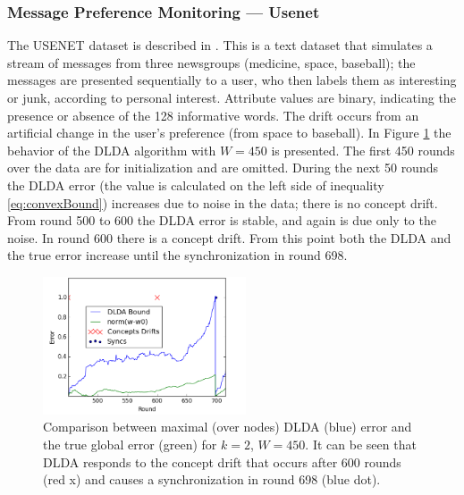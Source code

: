 \documentclass{sig-alternate-05-2015}
\begin{document}
\subsubsection{Message Preference Monitoring --- Usenet}
The USENET dataset is described in \cite{usenet}.
This is a text dataset that simulates a stream of messages from three newsgroups
(medicine, space, baseball); the messages are presented sequentially to a user, 
who then labels them as interesting or junk, according to personal interest. 
Attribute values are binary, indicating the presence or absence of the 128
informative words. The drift occurs from an artificial change in the user's
preference (from space to baseball). In Figure \ref{usenet} the behavior of the
DLDA algorithm with $W=450$ is presented. The first 450 rounds over the data are for
initialization and are omitted. During the next 50 rounds the DLDA error 
(the value is calculated on the left side of inequality
\ref{eq:convexBound}) increases due to noise in the data; there is
no concept drift. From round 500 to 600 the DLDA error is stable, 
and again is due only to the noise. In round 600 there is a concept 
drift.
From this point both the DLDA and the true error increase until the 
synchronization in round 698.

\begin{figure}[h]
	\centering
	\includegraphics[width=60mm]{Usenet/DriftDetected.png}
	\caption{Comparison between maximal (over nodes) DLDA (blue) 
	error and the true global error (green) for $k=2$, $W=450$. 
	It can be seen that DLDA responds to the concept drift that occurs 
	after 600 rounds (red x) and causes a synchronization in round 698 (blue dot).}
	\label{usenet}
	\end{figure}
	
\end{document}
